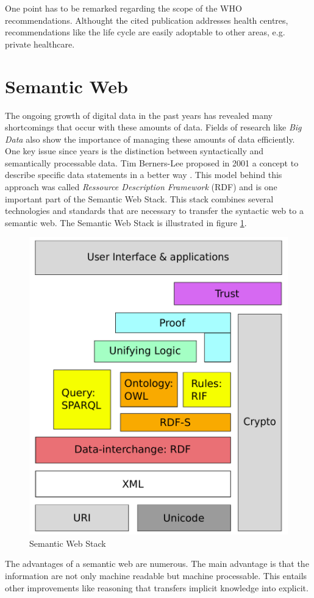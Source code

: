 One point has to be remarked regarding the scope of the WHO recommendations.
Althought the cited publication addresses health centres, recommendations like the life cycle are easily adoptable to other areas, e.g. private healthcare.

\section{Semantic Web}
\label{sec:semantic-web}
The ongoing growth of digital data in the past years has revealed many shortcomings that occur with these amounts of data.
Fields of research like \textit{Big Data} also show the importance of managing these amounts of data efficiently.
One key issue since years is the distinction between syntactically and semantically processable data.
Tim Berners-Lee proposed in 2001 a concept to describe specific data statements in a better way \cite{berners2001semantic}.
This model behind this approach was called \textit{Ressource Description Framework} (RDF) \cite{klyne2004resource} and is one important part of the Semantic Web Stack.
This stack combines several technologies and standards that are necessary to transfer the syntactic web to a semantic web.
The Semantic Web Stack is illustrated in figure \ref{fig:sem_stack}.
\begin{figure}
  \centering
  \includegraphics[scale=0.3]{preliminaries/semweb_stack}
  \caption{Semantic Web Stack}
  \label{fig:sem_stack}
\end{figure}
The advantages of a semantic web are numerous.
The main advantage is that the information are not only machine readable but machine processable.
This entails other improvements like reasoning that transfers implicit knowledge into explicit.

